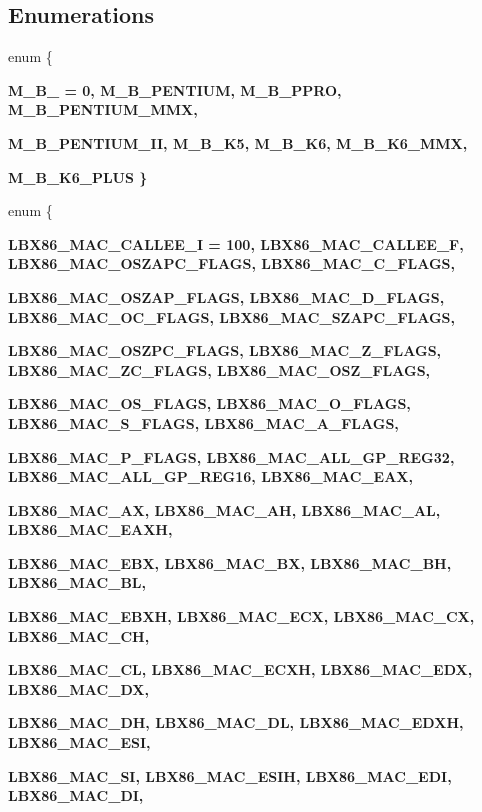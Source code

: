 \subsection*{Enumerations}
\begin{CompactItemize}
\item 
enum \{ \par
\bf{M\_\-B\_} =  0, 
\bf{M\_\-B\_\-PENTIUM}, 
\bf{M\_\-B\_\-PPRO}, 
\bf{M\_\-B\_\-PENTIUM\_\-MMX}, 
\par
\bf{M\_\-B\_\-PENTIUM\_\-II}, 
\bf{M\_\-B\_\-K5}, 
\bf{M\_\-B\_\-K6}, 
\bf{M\_\-B\_\-K6\_\-MMX}, 
\par
\bf{M\_\-B\_\-K6\_\-PLUS}
 \}
\item 
enum \{ \par
\bf{LBX86\_\-MAC\_\-CALLEE\_\-I} =  100, 
\bf{LBX86\_\-MAC\_\-CALLEE\_\-F}, 
\bf{LBX86\_\-MAC\_\-OSZAPC\_\-FLAGS}, 
\bf{LBX86\_\-MAC\_\-C\_\-FLAGS}, 
\par
\bf{LBX86\_\-MAC\_\-OSZAP\_\-FLAGS}, 
\bf{LBX86\_\-MAC\_\-D\_\-FLAGS}, 
\bf{LBX86\_\-MAC\_\-OC\_\-FLAGS}, 
\bf{LBX86\_\-MAC\_\-SZAPC\_\-FLAGS}, 
\par
\bf{LBX86\_\-MAC\_\-OSZPC\_\-FLAGS}, 
\bf{LBX86\_\-MAC\_\-Z\_\-FLAGS}, 
\bf{LBX86\_\-MAC\_\-ZC\_\-FLAGS}, 
\bf{LBX86\_\-MAC\_\-OSZ\_\-FLAGS}, 
\par
\bf{LBX86\_\-MAC\_\-OS\_\-FLAGS}, 
\bf{LBX86\_\-MAC\_\-O\_\-FLAGS}, 
\bf{LBX86\_\-MAC\_\-S\_\-FLAGS}, 
\bf{LBX86\_\-MAC\_\-A\_\-FLAGS}, 
\par
\bf{LBX86\_\-MAC\_\-P\_\-FLAGS}, 
\bf{LBX86\_\-MAC\_\-ALL\_\-GP\_\-REG32}, 
\bf{LBX86\_\-MAC\_\-ALL\_\-GP\_\-REG16}, 
\bf{LBX86\_\-MAC\_\-EAX}, 
\par
\bf{LBX86\_\-MAC\_\-AX}, 
\bf{LBX86\_\-MAC\_\-AH}, 
\bf{LBX86\_\-MAC\_\-AL}, 
\bf{LBX86\_\-MAC\_\-EAXH}, 
\par
\bf{LBX86\_\-MAC\_\-EBX}, 
\bf{LBX86\_\-MAC\_\-BX}, 
\bf{LBX86\_\-MAC\_\-BH}, 
\bf{LBX86\_\-MAC\_\-BL}, 
\par
\bf{LBX86\_\-MAC\_\-EBXH}, 
\bf{LBX86\_\-MAC\_\-ECX}, 
\bf{LBX86\_\-MAC\_\-CX}, 
\bf{LBX86\_\-MAC\_\-CH}, 
\par
\bf{LBX86\_\-MAC\_\-CL}, 
\bf{LBX86\_\-MAC\_\-ECXH}, 
\bf{LBX86\_\-MAC\_\-EDX}, 
\bf{LBX86\_\-MAC\_\-DX}, 
\par
\bf{LBX86\_\-MAC\_\-DH}, 
\bf{LBX86\_\-MAC\_\-DL}, 
\bf{LBX86\_\-MAC\_\-EDXH}, 
\bf{LBX86\_\-MAC\_\-ESI}, 
\par
\bf{LBX86\_\-MAC\_\-SI}, 
\bf{LBX86\_\-MAC\_\-ESIH}, 
\bf{LBX86\_\-MAC\_\-EDI}, 
\bf{LBX86\_\-MAC\_\-DI}, 
\par

\end{CompactItemize}
